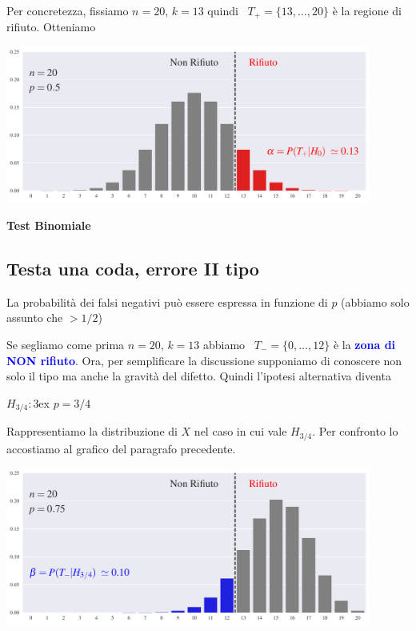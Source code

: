 \documentclass[12pt,openany]{book}
\def\emph#1{\textcolor{blue}{\textbf{\boldmath #1}}}
\theoremstyle{mio}
\theoremstyle{liscio}
\begin{document}
Per concretezza, fissiamo $n=20$, $k=13$ quindi {\color{red}\boldmath\ $T_+=\{13,\dots,20\}$} è la regione di rifiuto. Otteniamo %


\hfil\includegraphics[width=0.9\textwidth]{figure/B-test_01.pdf}


\clearpage\hfill\textbf{Test Binomiale}\subsection{Testa una coda, errore II tipo}

La probabilità dei falsi negativi può essere espressa in funzione di $p$ (abbiamo solo assunto che $>1/2$)



Se segliamo come prima $n=20$, $k=13$ abbiamo {\color{blue}\boldmath\ $T_-=\{0,\dots,12\}$} è la \emph{zona di NON rifiuto}.
Ora, per semplificare la discussione supponiamo di conoscere non solo il tipo ma anche la gravità del difetto. Quindi l'ipotesi alternativa diventa

$H_{3/4}:$\kern3ex $p=3/4$

Rappresentiamo la distribuzione di $X$ nel caso in cui vale $H_{3/4}$. Per confronto lo accostiamo al grafico del paragrafo precedente. 


\hfil\includegraphics[width=0.9\textwidth]{figure/B-test_02.pdf}
\end{document}
